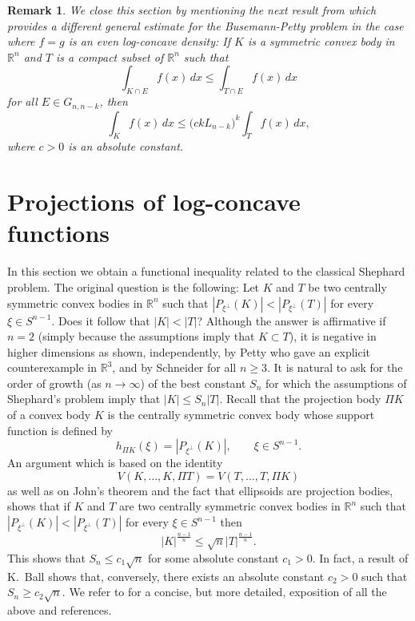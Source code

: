 \documentclass[11pt,leqno]{article}
\newtheorem{remark}[theorem]{Remark}
\theoremstyle{definition}
\theoremstyle{remark}
\numberwithin{equation}{section}
\newcommand{\ls}{\leqslant}
\newcommand{\gr}{\geqslant}
\newcommand{\1}{\textbf{1}}
\begin{document}
\begin{remark}\rm We close this section by mentioning the next result from \cite{CGL} which provides a different general estimate
for the Busemann-Petty problem in the case where $f=g$ is an even log-concave density: If $K$ is a symmetric convex body in ${\mathbb R}^n$ and $T$ is a compact subset of ${\mathbb R}^n$ such that
\begin{equation}\label{eq:intro-14}\int_{K\cap E}f(x)\,dx\ls \int_{T\cap E}f(x)\,dx\end{equation}
for all $E\in G_{n,n-k}$, then
\begin{equation}\label{eq:intro-15}\int_Kf(x)\,dx\ls \big(ckL_{n-k}\big)^{k}\int_Tf(x)\,dx,\end{equation}
where $c>0$ is an absolute constant.
\end{remark}

\section{Projections of log-concave functions}\label{section-6}

In this section we obtain a functional inequality related to the classical Shephard problem.
The original question is the following: Let $K$ and $T$ be two centrally symmetric convex bodies in
${\mathbb R}^n$ such that $|P_{\xi^{\perp}}(K)|<|P_{\xi^{\perp}}(T)|$ for every $\xi\in S^{n-1}$.
Does it follow that $|K|<|T|$? Although the answer is affirmative if $n=2$ (simply because
the assumptions imply that $K\subset T$), it is negative in higher dimensions as shown, independently,
by Petty who gave an explicit counterexample in ${\mathbb R}^3$, and by Schneider for all $n\gr 3$.
It is natural to ask for the order of growth
(as $n\to\infty$) of the best constant
$S_n$ for which the assumptions of Shephard's problem imply that $|K|\ls S_n|T|$.
Recall that the projection body $\Pi K$ of a convex body $K$ is
the centrally symmetric convex body whose support function is defined by
\begin{equation*}h_{\Pi K} (\xi)=|P_{\xi^{\perp} }(K)|,\qquad\xi\in S^{n-1}.\end{equation*}
An argument which is based on the identity
$$V(K,\ldots ,K,\Pi T)=V(T,\ldots ,T,\Pi K)$$
as well as on John's theorem and the fact that ellipsoids are projection bodies, shows that if $K$ and $T$ are two centrally symmetric convex bodies in ${\mathbb R}^n$ such that $|P_{\xi^{\perp}}(K)|<|P_{\xi^{\perp}}(T)|$ for every $\xi\in S^{n-1}$ then
\begin{equation}\label{eq:Pi}|K|^{{\frac{n-1}{n}}}\ls \sqrt{n}|T|^{{\frac{n-1}{n}}}.\end{equation}
This shows that $S_n\ls c_1\sqrt{n}$ for some absolute constant $c_1>0$. In fact, a result of K.~Ball \cite{Ball-1991}
shows that, conversely, there exists an absolute constant $c_2>0$ such that $S_n \gr c_2\sqrt{n}$. 	
We refer to \cite[Section~4.6.2]{AGA-book-2} for a concise, but more detailed, exposition of all the above and references.
\end{document}
